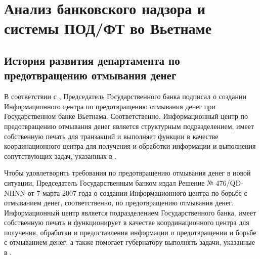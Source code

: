 \documentclass{article}
\begin{document}



\newpage

\section{Анализ банковского надзора и системы ПОД/ФТ во Вьетнаме}

\hfill

\subsection{История развития департамента по предотвращению отмывания денег}

В соответствии с \cite{ndcp7405}, Председатель Государственного банка подписал \cite{qdnh1002} о создании Информационного центра по предотвращению отмывания денег при Государственном банке Вьетнама. Соответственно, Информационный центр по предотвращению отмывания денег является структурным подразделением, имеет собственную печать для транзакций и выполняет функции в качестве координационного центра для получения и обработки информации и выполнения сопутствующих задач, указанных в \cite{ndcp7405}.

Чтобы удовлетворить требования по предотвращению отмывания денег в новой ситуации, Председатель Государственным банком издал Решение № 476/QĐ-NHNN от 7 марта 2007 года о создании Информационного центра по борьбе с отмыванием денег, соответственно, по предотвращению отмывания денег. Информационный центр является подразделением Государственного банка, имеет собственную печать и функционирует в качестве координационного центра для получения, обработки и предоставления информации о предотвращении и борьбе с отмыванием денег, а также помогает губернатору выполнять задачи, указанные в \cite{ndcp7405}.
\end{document}
